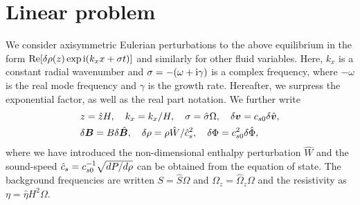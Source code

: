 \section{Linear problem}\label{linear}
We consider axisymmetric Eulerian perturbations to the above
equilibrium in the form $\operatorname{Re}[\delta\rho(z)\exp{\mathrm{i}(k_xx + \sigma
    t)}]$ and similarly for other fluid variables. Here, $k_x$ is a constant radial wavenumber and 
$\sigma=-(\omega +\mathrm{i}\gamma)$ is a complex 
frequency, where $-\omega$ is the real mode frequency and $\gamma$ is
the growth rate. Hereafter, we surpress the exponential factor, as
well as the real part notation.  We further write 
\begin{align}
  &z=\hat{z}H,\quad k_x =  k_x/H,\quad \sigma = \hat{\sigma}\Omega, \quad \delta\bm{v} = c_{s0}
  \delta\hat{\bm{v}}, \\ 
  &\delta\bm{B} = B\delta\hat{\bm{B}},\quad
  \delta\rho = \rho\hat{W}/\hat{c}_s^2,\quad \delta\Phi =
  c_{s0}^2\delta\hat{\Phi}, 
\end{align}
where we have introduced the non-dimensional enthalpy perturbation
$\hat{W}$ and the sound-speed $\hat{c}_s=c_{s0}^{-1}\sqrt{dP/d\rho}$ can be 
obtained from the equation of state. The background frequencies are
written $S=\hat{S}\Omega$ and $\Omega_z=\hat{\Omega}_z\Omega$ and the 
resistivity as $\eta = \hat{\eta}H^2\Omega$. 

